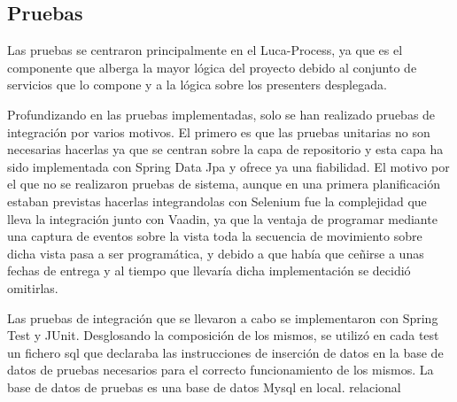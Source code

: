 	
\subsection{Pruebas}
	
	
	Las pruebas se centraron principalmente en el Luca-Process, ya que es el componente que alberga la mayor lógica del proyecto debido al conjunto de servicios que lo compone y a la lógica sobre los presenters desplegada.
	
	
	Profundizando en las pruebas implementadas, solo se han realizado pruebas de integración por varios motivos. El primero es que las pruebas unitarias no son necesarias hacerlas ya que se centran sobre la capa de repositorio y esta capa ha sido implementada con Spring Data Jpa\cite{jpa} y ofrece ya una fiabilidad. El motivo por el que no se realizaron pruebas de sistema, aunque en una primera planificación estaban previstas hacerlas integrandolas con Selenium\cite{selenium} fue la complejidad que lleva la integración junto con Vaadin\cite{vaadin}, ya que la ventaja de programar mediante una captura de eventos sobre la vista toda la secuencia de movimiento sobre dicha vista pasa a ser programática, y debido a que había que ceñirse a unas fechas de entrega y al tiempo que llevaría dicha implementación se decidió omitirlas.

	
	Las pruebas de integración que se llevaron a cabo se implementaron con Spring Test\cite{springTest} y JUnit\cite{junit}. Desglosando la composición de los mismos, se utilizó en cada test un fichero sql que declaraba las instrucciones de inserción de datos en la base de datos de pruebas necesarios para el correcto funcionamiento de los mismos. La base de datos de pruebas es una base de datos Mysql en local. relacional





	 